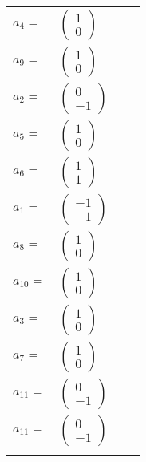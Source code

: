 \documentclass[1p]{elsarticle_modified}
\theoremstyle{definition}
\begin{document}
\begin{tabular}{m{7pt} m{180pt} m{7pt} m{180pt} }
\flushright $a_{4}=$&$\begin{pmatrix}1\\0\end{pmatrix}$ \\
\flushright $a_{9}=$&$\begin{pmatrix}1\\0\end{pmatrix}$ \\
\flushright $a_{2}=$&$\begin{pmatrix}0\\-1\end{pmatrix}$ \\
\flushright $a_{5}=$&$\begin{pmatrix}1\\0\end{pmatrix}$ \\
\flushright $a_{6}=$&$\begin{pmatrix}1\\1\end{pmatrix}$ \\
\flushright $a_{1}=$&$\begin{pmatrix}-1\\-1\end{pmatrix}$ \\
\flushright $a_{8}=$&$\begin{pmatrix}1\\0\end{pmatrix}$ \\
\flushright $a_{10}=$&$\begin{pmatrix}1\\0\end{pmatrix}$ \\
\flushright $a_{3}=$&$\begin{pmatrix}1\\0\end{pmatrix}$ \\
\flushright $a_{7}=$&$\begin{pmatrix}1\\0\end{pmatrix}$ \\
\flushright $a_{11}=$&$\begin{pmatrix}0\\-1\end{pmatrix}$\\ \flushright $a_{11}=$&$\begin{pmatrix}0\\-1\end{pmatrix}$\\&\end{tabular}
\end{document}
